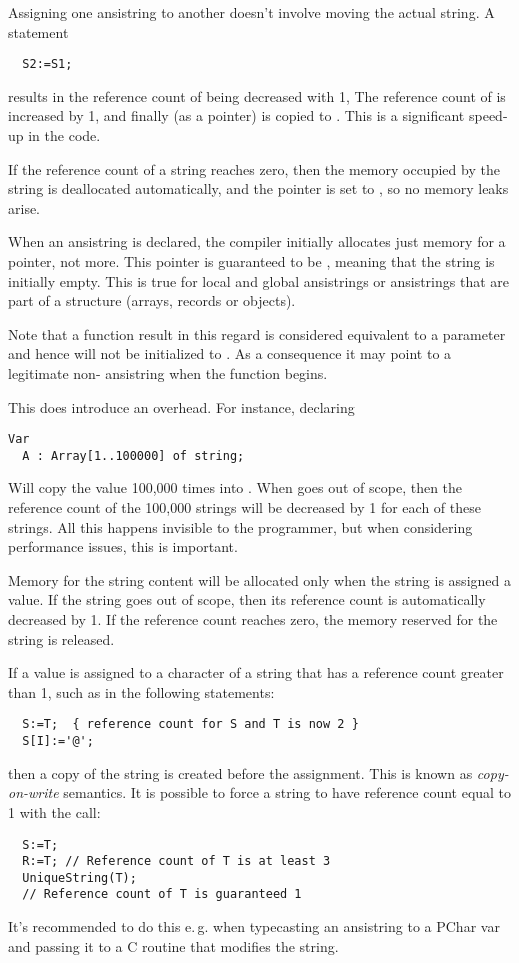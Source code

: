 Assigning one ansistring to another doesn't involve moving the actual
string. A statement
\begin{verbatim}
  S2:=S1;
\end{verbatim}
results in the reference count of  being decreased with 1,
The reference count of  is increased by 1, and finally 
(as a pointer) is copied to . This is a significant speed-up in
the code.

If the reference count of a string reaches zero, then the memory occupied
by the string is deallocated automatically, and the pointer is set to
, so no memory leaks arise.

When an ansistring is declared, the \fpc compiler initially
allocates just memory for a pointer, not more. This pointer is guaranteed
to be , meaning that the string is initially empty. This is
true for local and global ansistrings or ansistrings that are part of a
structure (arrays, records or objects).

\begin{remark}
Note that a function result in this regard is considered equivalent to a 
parameter and hence will not be initialized to . As a consequence
it may point to a legitimate non- ansistring when the function
begins.
\end{remark}

This  does introduce an overhead. For instance, declaring
\begin{verbatim}
Var
  A : Array[1..100000] of string;
\end{verbatim}
Will copy the value  100,000 times into .
When  goes out of scope, then the reference
count of the 100,000 strings will be decreased by 1 for each
of these strings. All this happens invisible to the programmer,
but when considering performance issues, this is important.

Memory for the string content will be allocated only when the string is
assigned a value. If the string goes out of scope, then its reference
count is automatically  decreased by 1. If the reference count reaches
zero, the memory reserved for the string is released.

If a value is assigned to a character of a string that has a reference count
greater than 1, such as in the following
statements:
\begin{verbatim}
  S:=T;  { reference count for S and T is now 2 }
  S[I]:='@';
\end{verbatim}
then a copy of the string is created before the assignment. This is known
as {\em copy-on-write} semantics. It is possible to force a string to have
reference count equal to 1 with the  call:
\begin{verbatim}
  S:=T;
  R:=T; // Reference count of T is at least 3
  UniqueString(T);
  // Reference count of T is guaranteed 1
\end{verbatim}
It's recommended to do this e.\,g. when typecasting an ansistring to a PChar var
and passing it to a C routine that modifies the string.

